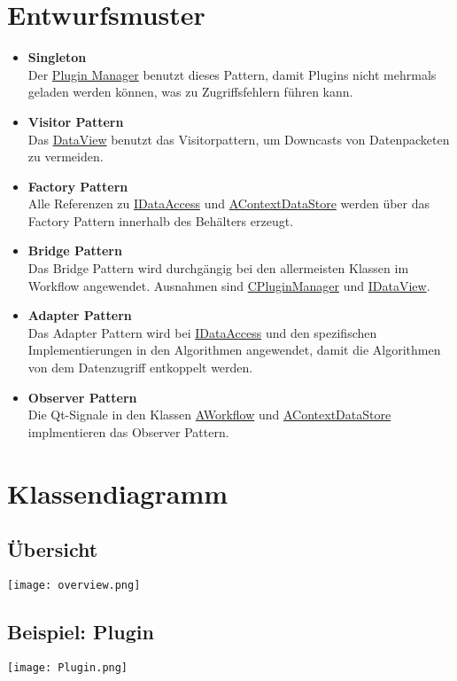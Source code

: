 \section{Entwurfsmuster}
\begin{itemize}
	\item \textbf{Singleton}
	\\ Der \hyperref[Workflow:CPluginManager]{Plugin Manager} benutzt dieses Pattern, damit Plugins nicht mehrmals geladen werden können, was zu Zugriffsfehlern führen kann.
	\item \textbf{Visitor Pattern}
	\\ Das \hyperref[Workflow:IDataView]{DataView} benutzt das Visitorpattern, um Downcasts von Datenpacketen zu vermeiden.
	\item \textbf{Factory Pattern}
	\\ Alle Referenzen zu \hyperref[Workflow:IDataAccess]{IDataAccess} und \hyperref[Workflow:AContextDataStore]{AContextDataStore} werden über das Factory Pattern innerhalb des Behälters erzeugt.
	\item \textbf{Bridge Pattern}
	\\ Das Bridge Pattern wird durchgängig bei den allermeisten Klassen im Workflow angewendet. Ausnahmen sind \hyperref[Workflow:CPluginManager]{CPluginManager} und \hyperref[Workflow:IDataView]{IDataView}.
	\item \textbf{Adapter Pattern}
	\\ Das Adapter Pattern wird bei \hyperref[Workflow:IDataAccess]{IDataAccess} und den spezifischen Implementierungen in den Algorithmen angewendet, damit die Algorithmen von dem Datenzugriff entkoppelt werden.
	\item \textbf{Observer Pattern}
	\\ Die Qt-Signale in den Klassen \hyperref[Workflow:AWorkflow]{AWorkflow} und \hyperref[Workflow:AContextDataStore]{AContextDataStore} implmentieren das Observer Pattern.
\end{itemize}
\section{Klassendiagramm}
\subsection{Übersicht}
\texttt{[image: overview.png]}
\subsection{Beispiel: Plugin}
\texttt{[image: Plugin.png]}